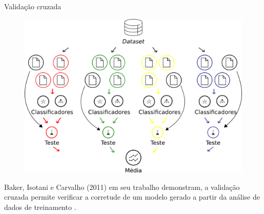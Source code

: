   \begin{frame}[fragile]{Validação cruzada}
    \begin{figure}[H]
        \begin{center}
            \includegraphics[scale=0.50]{images/validacao_cruzada.png}
        \end{center}
    \end{figure}
    Baker, Isotani e Carvalho (2011) em seu trabalho demonstram, a validação
    cruzada permite verificar a corretude de um modelo gerado a partir da
    análise de dados de treinamento \cite{baker2011mineraccao}.
  \end{frame}
